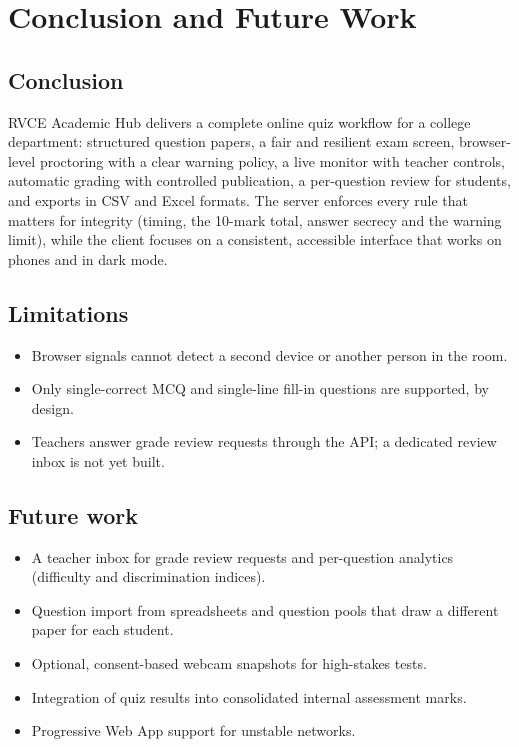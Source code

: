 \documentclass[12pt,a4paper,oneside]{report}
\newcommand{\appname}{RVCE Academic Hub}
\begin{document}
\chapter{Conclusion and Future Work}
\label{ch:concl}

\section{Conclusion}
\appname{} delivers a complete online quiz workflow for a college department: structured question papers, a fair and
resilient exam screen, browser-level proctoring with a clear warning policy, a live monitor with teacher controls,
automatic grading with controlled publication, a per-question review for students, and exports in CSV and Excel
formats. The server enforces every rule that matters for integrity (timing, the 10-mark total, answer secrecy and the
warning limit), while the client focuses on a consistent, accessible interface that works on phones and in dark mode.

\section{Limitations}
\begin{itemize}
  \item Browser signals cannot detect a second device or another person in the room.
  \item Only single-correct MCQ and single-line fill-in questions are supported, by design.
  \item Teachers answer grade review requests through the API; a dedicated review inbox is not yet built.
\end{itemize}

\section{Future work}
\begin{itemize}
  \item A teacher inbox for grade review requests and per-question analytics (difficulty and discrimination indices).
  \item Question import from spreadsheets and question pools that draw a different paper for each student.
  \item Optional, consent-based webcam snapshots for high-stakes tests.
  \item Integration of quiz results into consolidated internal assessment marks.
  \item Progressive Web App support for unstable networks.
\end{itemize}
\end{document}
